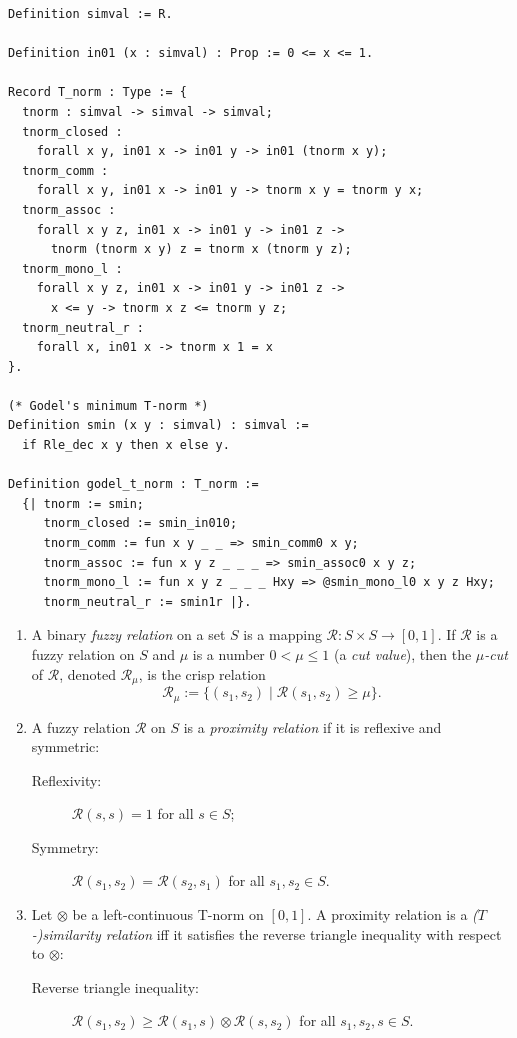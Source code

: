 \begin{lstlisting}[style=rocqstyle,caption={T-norms and Gödel's minimum (\texttt{SimilarityRelations.v}).},label={lst:tnorm}]
Definition simval := R.

Definition in01 (x : simval) : Prop := 0 <= x <= 1.

Record T_norm : Type := {
  tnorm : simval -> simval -> simval;
  tnorm_closed :
    forall x y, in01 x -> in01 y -> in01 (tnorm x y);
  tnorm_comm :
    forall x y, in01 x -> in01 y -> tnorm x y = tnorm y x;
  tnorm_assoc :
    forall x y z, in01 x -> in01 y -> in01 z ->
      tnorm (tnorm x y) z = tnorm x (tnorm y z);
  tnorm_mono_l :
    forall x y z, in01 x -> in01 y -> in01 z ->
      x <= y -> tnorm x z <= tnorm y z;
  tnorm_neutral_r :
    forall x, in01 x -> tnorm x 1 = x
}.

(* Godel's minimum T-norm *)
Definition smin (x y : simval) : simval :=
  if Rle_dec x y then x else y.

Definition godel_t_norm : T_norm :=
  {| tnorm := smin;
     tnorm_closed := smin_in010;
     tnorm_comm := fun x y _ _ => smin_comm0 x y;
     tnorm_assoc := fun x y z _ _ _ => smin_assoc0 x y z;
     tnorm_mono_l := fun x y z _ _ _ Hxy => @smin_mono_l0 x y z Hxy;
     tnorm_neutral_r := smin1r |}.
\end{lstlisting}

\begin{definition}\mbox{}
\begin{enumerate}
\item A binary \emph{fuzzy relation} on a set $S$ is a mapping
$\mathcal{R}:S\times S\to[0,1]$. If $\mathcal{R}$ is a fuzzy relation on $S$ and
$\mu$ is a number $0<\mu\le 1$ (a \emph{cut value}), then the \emph{$\mu$-cut} of
$\mathcal{R}$, denoted $\mathcal{R}_\mu$, is the crisp relation
\[
  \mathcal{R}_\mu := \{(s_1,s_2)\mid \mathcal{R}(s_1,s_2)\ge\mu\}.
\]
\item A fuzzy relation $\mathcal{R}$ on $S$ is a \emph{proximity relation} if it is
reflexive and symmetric:
\begin{description}
  \item[Reflexivity:] $\mathcal{R}(s,s)=1$ for all $s\in S$;
  \item[Symmetry:] $\mathcal{R}(s_1,s_2)=\mathcal{R}(s_2,s_1)$ for all
        $s_1,s_2\in S$.
\end{description}
\item Let $\otimes$ be a left-continuous T-norm on $[0,1]$. A proximity relation is
a \emph{($T$-)similarity relation} iff it satisfies the reverse triangle inequality
with respect to $\otimes$:
\begin{description}
  \item[Reverse triangle inequality:]
        $\mathcal{R}(s_1,s_2)\ge \mathcal{R}(s_1,s)\otimes\mathcal{R}(s,s_2)$ for all
        $s_1,s_2,s\in S$.
\end{description}
\end{enumerate}
\end{definition}

